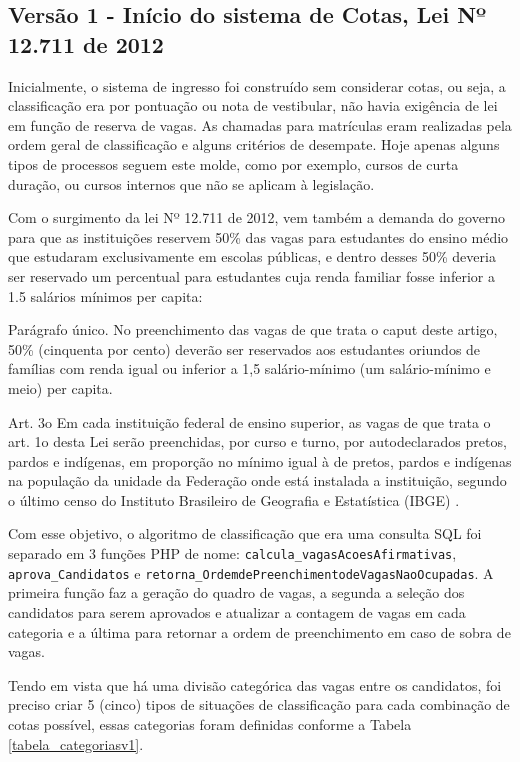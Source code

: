 \subsection{Versão 1 - Início do sistema de Cotas, Lei Nº 12.711 de 2012}
\label{versao1}

Inicialmente, o sistema de ingresso foi construído sem considerar cotas, ou seja, a classificação era por pontuação ou nota de vestibular, não havia exigência de lei em função de reserva de vagas. As chamadas para matrículas eram realizadas pela ordem geral de classificação e alguns critérios de desempate. Hoje apenas alguns tipos de processos seguem este molde, como por exemplo, cursos de curta duração, ou cursos internos que não se aplicam à legislação.

Com o surgimento da lei Nº 12.711 de 2012, vem também a demanda do governo para que as instituições reservem 50\% das vagas para estudantes do ensino médio que estudaram exclusivamente em escolas públicas, e dentro desses 50\% deveria ser reservado um percentual para estudantes cuja renda familiar fosse inferior a 1.5 salários mínimos per capita:

\begin{citacao}
Parágrafo único.  No preenchimento das vagas de que trata o caput deste artigo, 50\% (cinquenta por cento) deverão ser reservados aos estudantes oriundos de famílias com renda igual ou inferior a 1,5 salário-mínimo (um salário-mínimo e meio) per capita.

Art. 3o  Em cada instituição federal de ensino superior, as vagas de que trata o art. 1o desta Lei serão preenchidas, por curso e turno, por autodeclarados pretos, pardos e indígenas, em proporção no mínimo igual à de pretos, pardos e indígenas na população da unidade da Federação onde está instalada a instituição, segundo o último censo do Instituto Brasileiro de Geografia e Estatística (IBGE) \cite{leicotas}.
\end{citacao}

Com esse objetivo, o algoritmo de classificação que era uma consulta SQL foi separado em 3 funções PHP de nome: \texttt{calcula\_vagasAcoesAfirmativas}, \texttt{aprova\_Candidatos} e \texttt{retorna\_OrdemdePreenchimentodeVagasNaoOcupadas}.  A primeira função faz a geração do quadro de vagas, a segunda a seleção dos candidatos para serem aprovados e atualizar a contagem de vagas em cada categoria e a última para retornar a ordem de preenchimento em caso de sobra de vagas.

Tendo em vista que há uma divisão categórica das vagas entre os candidatos, foi preciso criar 5 (cinco) tipos de situações de classificação para cada combinação de cotas possível, essas categorias foram definidas conforme a Tabela \ref{tabela_categoriasv1}.

